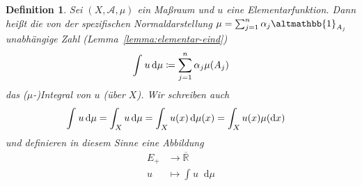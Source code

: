 \documentclass[11pt, twoside, a4paper]{article}
\theoremstyle{plain}
\newtheorem{definition}[blockelement]{Definition}
\numberwithin{equation}{subsection}
\newcommand{\pair}[1]{\left(#1\right)}
\newcommand{\of}[1]{\mathopen{}\mathclose{}\bgroup\left(#1\aftergroup\egroup\right)}
\newcommand{\dif}{\mathop{}\!\mathrm{d}}
\newcommand{\charfunc}{\altmathbb{1}}
\newcommand{\R}{\mathbb{R}}
\newcommand{\mA}{\mathcal{A}}
\begin{document}
    \begin{definition}
        \marginnote{[16. Dez]}
        Sei $\pair{X, \mA, \mu}$ ein Maßraum und $u$ eine Elementarfunktion. Dann heißt die von der spezifischen Normaldarstellung $\mu = \sum_{j=1}^{n} \alpha_j \charfunc_{A_j}$ unabhängige Zahl (Lemma~\ref{lemma:elementar-eind})
        \begin{align*}
            \int_{}^{} u \dif \mu \coloneqq \sum_{j=1}^{n} \alpha_j \mu\of{A_j}
        \end{align*}
        das ($\mu$-)Integral von $u$ (über $X$). Wir schreiben auch
        \begin{align*}
            \int_{}^{} u \dif \mu = \int_{X}^{} u \dif \mu &= \int_{X}^{} u\of{x} \dif \mu\of{x} = \int_{X}^{} u\of{x} \mu\of{\dif x}
        \end{align*}
        und definieren in diesem Sinne eine Abbildung
        \begin{align*}
            E_+ &\to \overline{\R}\\
            u &\mapsto \int_{}^{} u \dif \mu
        \end{align*}
    \end{definition}
\end{document}
